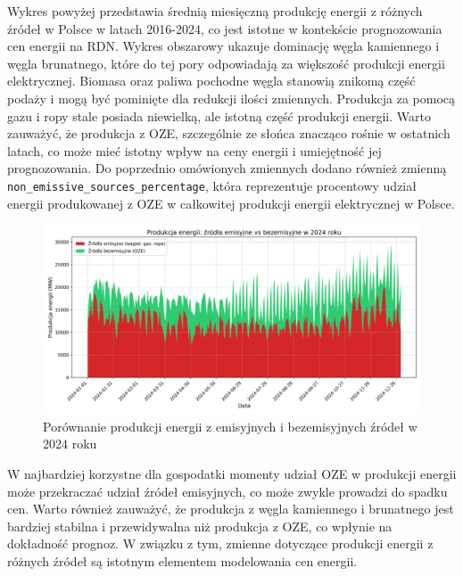 Wykres powyżej przedstawia średnią miesięczną produkcję energii z różnych źródeł w Polsce w latach 2016-2024, co jest istotne w kontekście prognozowania cen energii na RDN. Wykres obszarowy ukazuje dominację węgla kamiennego i węgla brunatnego, które do tej pory odpowiadają za większość produkcji energii elektrycznej. Biomasa oraz paliwa pochodne węgla stanowią znikomą część podaży i mogą być pominięte dla redukcji ilości zmiennych. Produkcja za pomocą gazu i ropy stale posiada niewielką, ale istotną część produkcji energii. Warto zauważyć, że produkcja z OZE, szczególnie ze słońca znacząco rośnie w ostatnich latach, co może mieć istotny wpływ na ceny energii i umiejętność jej prognozowania. Do poprzednio omówionych zmiennych dodano również zmienną \texttt{non\_emissive\_sources\_percentage}, która reprezentuje procentowy udział energii produkowanej z OZE w całkowitej produkcji energii elektrycznej w Polsce.
\begin{figure}[H]
    \centering
    \includegraphics[width=\textwidth]{../plots/energy/emission_vs_non_emission_2024.png}
    \caption{Porównanie produkcji energii z emisyjnych i bezemisyjnych źródeł w 2024 roku}
    \label{fig:emission-vs-non-emission-2024}
\end{figure}
W najbardziej korzystne dla gospodatki momenty udział OZE w produkcji energii może przekraczać udział źródeł emisyjnych, co może zwykle prowadzi do spadku cen. Warto również zauważyć, że produkcja z węgla kamiennego i brunatnego jest bardziej stabilna i przewidywalna niż produkcja z OZE, co wpłynie na dokładność prognoz. W związku z tym, zmienne dotyczące produkcji energii z różnych źródeł są istotnym elementem modelowania cen energii.

